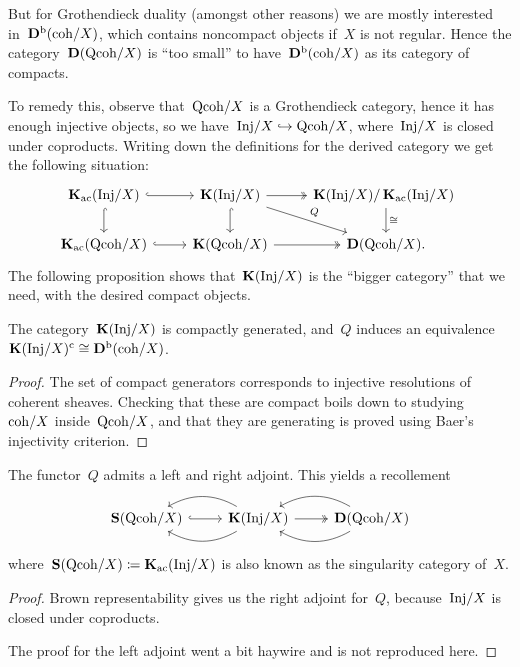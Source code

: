 \documentclass[10pt,a4paper]{article}
\begin{document}
But for Grothendieck duality (amongst other reasons) we are mostly interested in~$\mathbf{D}^{\mathrm{b}}(\mathrm{coh}/X)$, which contains noncompact objects  if~$X$ is not regular. Hence the category~$\mathbf{D}(\mathrm{Qcoh}/X)$ is ``too small'' to have~$\mathbf{D}^{\mathrm{b}}(\mathrm{coh}/X)$ as its category of compacts.

To remedy this, observe that~$\mathrm{Qcoh}/X$ is a Grothendieck category, hence it has enough injective objects, so we have~$\mathrm{Inj}/X\hookrightarrow\mathrm{Qcoh}/X$, where~$\mathrm{Inj}/X$ is closed under coproducts. Writing down the definitions for the derived category we get the following situation:
\begin{equation}
  \begin{tikzcd}
    \KKK_\ac(\Inj/X) \arrow[hook]{r} \arrow[hook]{d} & \KKK(\Inj/X) \arrow[hook]{d} \arrow[two heads]{r} \arrow{rd}{Q} & \KKK(\Inj/X)/\KKK_\ac(\Inj/X) \arrow{d}{\cong} \\
    \KKK_\ac(\Qcoh/X) \arrow[hook]{r} & \KKK(\Qcoh/X) \arrow[two heads]{r} & \derived(\Qcoh/X).
  \end{tikzcd}
\end{equation}
The following proposition shows that~$\operatorname{\mathbf{K}}(\mathrm{Inj}/X)$ is the ``bigger category'' that we need, with the desired compact objects.
\begin{proposition}
  The category~$\operatorname{\mathbf{K}}(\mathrm{Inj}/X)$ is compactly generated, and~$Q$ induces an equivalence~$\operatorname{\mathbf{K}}(\mathrm{Inj}/X)^{\mathrm{c}}\cong\mathbf{D}^{\mathrm{b}}(\mathrm{coh}/X)$.
  \begin{proof}
    The set of compact generators corresponds to injective resolutions of coherent sheaves. Checking that these are compact boils down to studying~$\mathrm{coh}/X$ inside~$\mathrm{Qcoh}/X$, and that they are generating is proved using Baer's injectivity criterion.
  \end{proof}
\end{proposition}
\begin{theorem}
  The functor~$Q$ admits a left and right adjoint. This yields a recollement
  \begin{equation}
    \begin{tikzcd}
      \SSing(\Qcoh/X) \arrow[hook]{r} & \KKK(\Inj/X) \arrow[bend right, swap]{l} \arrow[bend left]{l} \arrow[two heads]{r} & \derived(\Qcoh/X) \arrow[bend right, swap]{l} \arrow[bend left]{l}
    \end{tikzcd}
  \end{equation}
  where~$\operatorname{\mathbf{S}}(\mathrm{Qcoh}/X)\coloneqq\operatorname{\mathbf{K}}_{\mathrm{ac}}(\mathrm{Inj}/X)$ is also known as the singularity category of~$X$.

  \begin{proof}
    Brown representability gives us the right adjoint for~$Q$, because~$\mathrm{Inj}/X$ is closed under coproducts.

    The proof for the left adjoint went a bit haywire and is not reproduced here.
  \end{proof}
\end{theorem}
\end{document}
